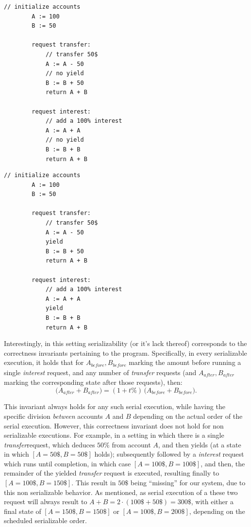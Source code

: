 \noindent
\begin{minipage}[t]{0.45\textwidth}
	\begin{lstlisting}[caption={bank (serializable)},
		label={lst:BankSer}]
	    // initialize accounts
	    A := 100
	    B := 50
	    
	    request transfer: 
	        // transfer 50$
	        A := A - 50
	        // no yield
	        B := B + 50
	        return A + B
				
	    request interest: 
	        // add a 100% interest
	        A := A + A
	        // no yield
	        B := B + B
	        return A + B	      		        
			\end{lstlisting}
\end{minipage}
\hfill
\begin{minipage}[t]{0.45\textwidth}
	\begin{lstlisting}[caption={bank with yields (non serializable)},
		label={lst:BankNonSer}]
	    // initialize accounts
	    A := 100
	    B := 50
			
	    request transfer: 
	        // transfer 50$
	        A := A - 50
	        yield
	        B := B + 50
	        return A + B
	
	    request interest: 
	        // add a 100% interest
	        A := A + A
	        yield
	        B := B + B
	        return A + B	      		        
		\end{lstlisting}
\end{minipage}
	

Interestingly, in this setting serializability (or it's lack thereof) corresponds to the correctness invariants pertaining to the program. Specifically, in every serializable execution, it holds that for $A_{\textit{before}},B_{\textit{before}}$ marking the amount before running a single \textit{interest} request, and any number of \textit{transfer} requests (and $A_{\textit{after}},B_{\textit{after}}$ marking the corresponding state after those requests), then:
\[
\bigl(A_{\mathit{after}} + B_{\mathit{after}}\bigr)
= (1 + t\%)\,\bigl(A_{\mathit{before}} + B_{\mathit{before}}\bigr).
\]

This invariant always holds for any such serial execution, while having the specific division \textit{between} accounts $A$ and $B$ depending on the actual order of the serial execution.
%
However, this correctness invariant does not hold for non serializable executions. For example, in a setting in which there is a single \textit{transfer}request, which deduces $50\%$ from account $A$, and then yields (at a state in which $[A=50\$,B=50\$]$ holds); subsequently followed by a  \textit{interest} request which runs until completion, in which case  $[A=100\$,B=100\$]$, and then, the remainder of the yielded \textit{transfer} request is executed, resulting finally to $[A=100\$, B=150\$]$.  This result in $50\$$ being ``missing'' for our system, due to this non serializable behavior.
%
As mentioned, as serial execution of a these two request will always result to 
$A+B=2\cdot (100\$+50\$)=300\$$, with either a final state of $[A=150\$, B=150\$]$ or $[A=100\$, B=200\$]$, depending on the scheduled serializable order.




